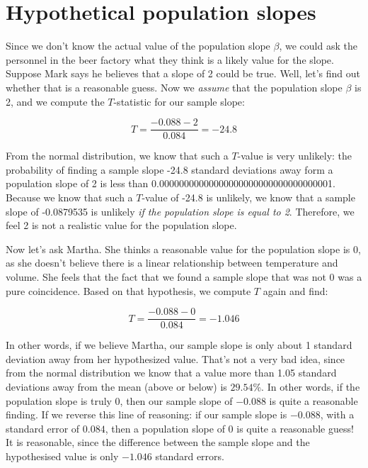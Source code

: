 \documentclass[]{report}\usepackage[]{graphicx}\usepackage[]{color}
\begin{document}
\section{Hypothetical population slopes}


Since we don't know the actual value of the population slope $\beta$, we could ask the personnel in the beer factory what they think is a likely value for the slope. Suppose Mark says he believes that a slope of 2 could be true. Well, let's find out whether that is a reasonable guess. Now we \textit{assume} that the population slope $\beta$ is 2, and we compute the $T$-statistic for our sample slope:



\begin{equation}
T = \frac{-0.088-2}{0.084}= -24.8
\end{equation}

From the normal distribution, we know that such a $T$-value is very unlikely: the probability of finding a sample slope -24.8 standard deviations away form a population slope of 2 is less than 0.00000000000000000000000000000000001. Because we know that such a $T$-value of -24.8 is unlikely, we know that a sample slope of -0.0879535 is unlikely \textit{if the population slope is equal to 2}. Therefore, we feel 2 is not a realistic value for the population slope.


Now let's ask Martha. She thinks a reasonable value for the population slope is 0, as she doesn't believe there is a linear relationship between temperature and volume. She feels that the fact that we found a sample slope that was not 0 was a pure coincidence. Based on that hypothesis, we compute $T$ again and find:


\begin{equation}
T = \frac{-0.088-0}{0.084}= -1.046
\end{equation}

In other words, if we believe Martha, our sample slope is only about 1 standard deviation away from her hypothesized value. That's not a very bad idea, since from the normal distribution we know that a value more than 1.05 standard deviations away from the mean (above or below) is $29.54$\%. In other words, if the population slope is truly 0, then our sample slope of $-0.088$ is quite a reasonable finding. If we reverse this line of reasoning: if our sample slope is $-0.088$, with a standard error of $0.084$, then a population slope of 0 is quite a reasonable guess! It is reasonable, since the difference between the sample slope and the hypothesised value is only $-1.046$ standard errors.
\end{document}
